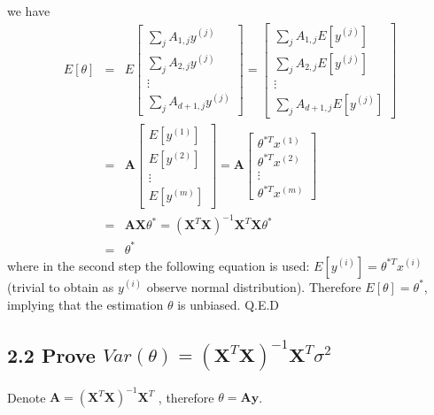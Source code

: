 \documentclass[english,11pt]{article}
\begin{document}
we have 
\begin{eqnarray}
E[\theta] & = & E\left[\begin{array}{c}
\sum_{j}A_{1,j}y^{(j)}\\
\sum_{j}A_{2,j}y^{(j)}\\
\vdots\\
\sum_{j}A_{d+1,j}y^{(j)}
\end{array}\right]=\left[\begin{array}{c}
\sum_{j}A_{1,j}E[y^{(j)}]\\
\sum_{j}A_{2,j}E[y^{(j)}]\\
\vdots\\
\sum_{j}A_{d+1,j}E[y^{(j)}]
\end{array}\right] \\
 & = & \boldsymbol{A}\left[\begin{array}{c}
E[y^{(1)}]\\
E[y^{(2)}]\\
\vdots\\
E[y^{(m)}]
\end{array}\right]=\boldsymbol{A}\left[\begin{array}{c}
\theta^{*T}x^{(1)}\\
\theta^{*T}x^{(2)}\\
\vdots\\
\theta^{*T}x^{(m)}
\end{array}\right]\\
 & = & \boldsymbol{A}\boldsymbol{X}\theta^{*}=(\boldsymbol{X}^{T}\boldsymbol{X})^{-1}\boldsymbol{X}^{T}\boldsymbol{X}\theta^{*}\\
 & = & \theta^{*}
\end{eqnarray}
where in the second step the following equation is used: $E[y^{(i)}]=\theta^{*T}x^{(i)}$
(trivial to obtain as $y^{(i)}$ observe normal distribution). Therefore
$E[\theta]=\theta^{*}$, implying that the estimation $\theta$ is
unbiased. Q.E.D

\subsection*{2.2 Prove $Var(\theta)=\left(\boldsymbol{X}^{T}\boldsymbol{X}\right)^{-1}\boldsymbol{X}^{T}\sigma^{2}$}

Denote $\boldsymbol{A}=(\boldsymbol{X}^{T}\boldsymbol{X})^{-1}\boldsymbol{X}^{T}$
, therefore $\theta=\boldsymbol{A}\boldsymbol{y}$.
\end{document}
